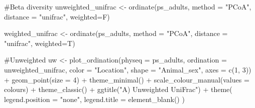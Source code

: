 \documentclass[
  letterpaper,
  DIV=11,
  numbers=noendperiod]{scrartcl}
\newenvironment{Shaded}{\begin{snugshade}}{\end{snugshade}}
\newcommand{\AttributeTok}[1]{\textcolor[rgb]{0.40,0.45,0.13}{#1}}
\newcommand{\CommentTok}[1]{\textcolor[rgb]{0.37,0.37,0.37}{#1}}
\newcommand{\DecValTok}[1]{\textcolor[rgb]{0.68,0.00,0.00}{#1}}
\newcommand{\FunctionTok}[1]{\textcolor[rgb]{0.28,0.35,0.67}{#1}}
\newcommand{\NormalTok}[1]{\textcolor[rgb]{0.00,0.23,0.31}{#1}}
\newcommand{\OtherTok}[1]{\textcolor[rgb]{0.00,0.23,0.31}{#1}}
\newcommand{\SpecialCharTok}[1]{\textcolor[rgb]{0.37,0.37,0.37}{#1}}
\newcommand{\StringTok}[1]{\textcolor[rgb]{0.13,0.47,0.30}{#1}}
\begin{document}
\begin{Shaded}
\begin{Highlighting}[]
\CommentTok{\#Beta diversity}
\NormalTok{unweighted\_unifrac }\OtherTok{\textless{}{-}} \FunctionTok{ordinate}\NormalTok{(ps\_adults, }
                               \AttributeTok{method =} \StringTok{"PCoA"}\NormalTok{, }
                               \AttributeTok{distance =} \StringTok{"unifrac"}\NormalTok{, }\AttributeTok{weighted=}\NormalTok{F)}

\NormalTok{weighted\_unifrac }\OtherTok{\textless{}{-}} \FunctionTok{ordinate}\NormalTok{(ps\_adults, }
                               \AttributeTok{method =} \StringTok{"PCoA"}\NormalTok{, }
                               \AttributeTok{distance =} \StringTok{"unifrac"}\NormalTok{, }\AttributeTok{weighted=}\NormalTok{T)}

\CommentTok{\#Unweighted}
\NormalTok{uw }\OtherTok{\textless{}{-}} \FunctionTok{plot\_ordination}\NormalTok{(}\AttributeTok{physeq =}\NormalTok{ ps\_adults,}
                \AttributeTok{ordination =}\NormalTok{ unweighted\_unifrac,}
                \AttributeTok{color =} \StringTok{"Location"}\NormalTok{,}
                \AttributeTok{shape =} \StringTok{"Animal\_sex"}\NormalTok{,}
                \AttributeTok{axes =} \FunctionTok{c}\NormalTok{(}\DecValTok{1}\NormalTok{, }\DecValTok{3}\NormalTok{)) }\SpecialCharTok{+}
  \FunctionTok{geom\_point}\NormalTok{(}\AttributeTok{size =} \DecValTok{4}\NormalTok{) }\SpecialCharTok{+}
  \FunctionTok{theme\_minimal}\NormalTok{() }\SpecialCharTok{+}
  \FunctionTok{scale\_colour\_manual}\NormalTok{(}\AttributeTok{values =}\NormalTok{ colours) }\SpecialCharTok{+}
  \FunctionTok{theme\_classic}\NormalTok{() }\SpecialCharTok{+}
  \FunctionTok{ggtitle}\NormalTok{(}\StringTok{"A) Unweighted UniFrac"}\NormalTok{) }\SpecialCharTok{+}
  \FunctionTok{theme}\NormalTok{(}
    \AttributeTok{legend.position =} \StringTok{"none"}\NormalTok{,}
    \AttributeTok{legend.title =} \FunctionTok{element\_blank}\NormalTok{()}
\NormalTok{    ) }


\end{Highlighting}
\end{Shaded}
\end{document}
